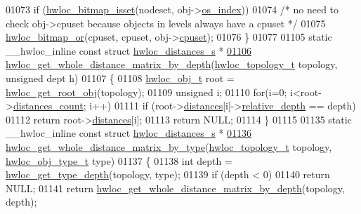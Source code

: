 \begin{DoxyCode}
01073                 \textcolor{keywordflow}{if} (\hyperlink{a00065_ga2583f44cbdb5fff2ea40efdcf3975d3f}{hwloc_bitmap_isset}(nodeset, obj->\hyperlink{a00016_a61a7a80a68eaccbaaa28269e678c81a9}{os_index}))
01074                         \textcolor{comment}{/* no need to check obj->cpuset because objects in levels
       always have a cpuset */}
01075                         \hyperlink{a00065_ga1ba1de709ee9a7cf5cc8ad2d9a1a81d4}{hwloc_bitmap_or}(cpuset, cpuset, obj->\hyperlink{a00016_a67925e0f2c47f50408fbdb9bddd0790f}{cpuset});
01076 \}
01077 
01105 \textcolor{keyword}{static} \_\_hwloc\_inline \textcolor{keyword}{const} \textcolor{keyword}{struct }\hyperlink{a00014}{hwloc_distances_s} *
\hypertarget{a00031_source_l01106}{}\hyperlink{a00063_ga48dfec8b8ba1fb8f2073ecd0728f0ca6}{01106} \hyperlink{a00063_ga48dfec8b8ba1fb8f2073ecd0728f0ca6}{hwloc_get_whole_distance_matrix_by_depth}(\hyperlink{a00039_ga9d1e76ee15a7dee158b786c30b6a6e38}{hwloc_topology_t} topology, \textcolor{keywordtype}{unsigned} dept
      h)
01107 \{
01108   \hyperlink{a00016}{hwloc_obj_t} root = \hyperlink{a00053_gadbf58f6e187efbdb3cd9a8e30311b7d7}{hwloc_get_root_obj}(topology);
01109   \textcolor{keywordtype}{unsigned} i;
01110   \textcolor{keywordflow}{for}(i=0; i<root->\hyperlink{a00016_a8be6f63eca4da91000c832280db927b7}{distances_count}; i++)
01111     \textcolor{keywordflow}{if} (root->\hyperlink{a00016_a9a5dd75596edc48fe834f81988cdc0d6}{distances}[i]->\hyperlink{a00014_a6fe066eaf62ee448aa05bab8e7217ff7}{relative_depth} == depth)
01112       \textcolor{keywordflow}{return} root->\hyperlink{a00016_a9a5dd75596edc48fe834f81988cdc0d6}{distances}[i];
01113   \textcolor{keywordflow}{return} NULL;
01114 \}
01115 
01135 \textcolor{keyword}{static} \_\_hwloc\_inline \textcolor{keyword}{const} \textcolor{keyword}{struct }\hyperlink{a00014}{hwloc_distances_s} *
\hypertarget{a00031_source_l01136}{}\hyperlink{a00063_ga9979237728f7a00a38836e15a8e8cd17}{01136} \hyperlink{a00063_ga9979237728f7a00a38836e15a8e8cd17}{hwloc_get_whole_distance_matrix_by_type}(\hyperlink{a00039_ga9d1e76ee15a7dee158b786c30b6a6e38}{hwloc_topology_t} topology, 
      \hyperlink{a00041_gacd37bb612667dc437d66bfb175a8dc55}{hwloc_obj_type_t} type)
01137 \{
01138   \textcolor{keywordtype}{int} depth = \hyperlink{a00046_gaea7c64dd59467f5201ba87712710b14d}{hwloc_get_type_depth}(topology, type);
01139   \textcolor{keywordflow}{if} (depth < 0)
01140     \textcolor{keywordflow}{return} NULL;
01141   \textcolor{keywordflow}{return} \hyperlink{a00063_ga48dfec8b8ba1fb8f2073ecd0728f0ca6}{hwloc_get_whole_distance_matrix_by_depth}(topology, depth);

\end{DoxyCode}
